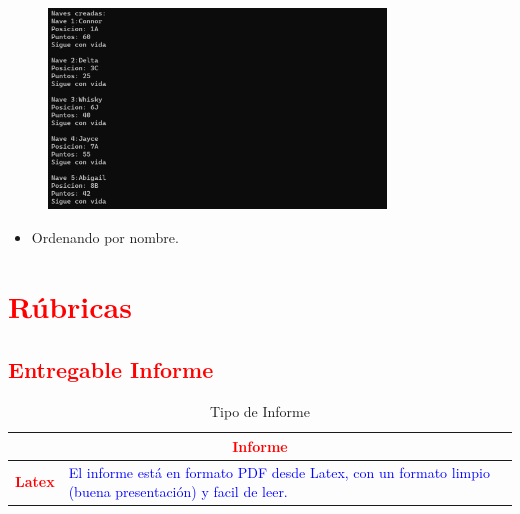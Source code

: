 \documentclass{article}
\begin{document}
	\begin{figure}[H]
		\centering
		\includegraphics[width=0.8\textwidth,keepaspectratio]{img/captura1.png}
	\end{figure}
	\begin{itemize}
		\item Ordenando por nombre.
	\end{itemize}
	
	\section{\textcolor{red}{Rúbricas}}
	
	\subsection{\textcolor{red}{Entregable Informe}}
	\begin{table}[H]
		\caption{Tipo de Informe}
		\setlength{\tabcolsep}{0.5em} %
		{\renewcommand{\arraystretch}{1.5}%
		\begin{tabular}{|p{3cm}|p{12cm}|}
			\hline
			\multicolumn{2}{|c|}{\textbf{\textcolor{red}{Informe}}}  \\
			\hline 
			\textbf{\textcolor{red}{Latex}} & \textcolor{blue}{El informe está en formato PDF desde Latex,  con un formato limpio (buena presentación) y facil de leer.}   \\ 
			\hline 
			
			
		\end{tabular}
	}
	\end{table}
	
	\clearpage
	
\end{document}
